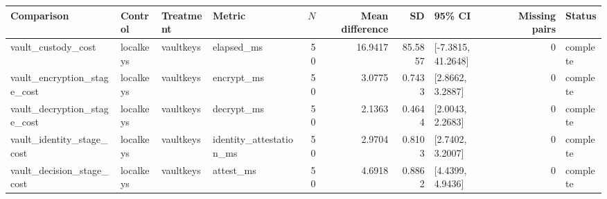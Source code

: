 \begin{tabular}{llllrrrlrl}
Comparison & Control & Treatment & Metric & $N$ & Mean difference & SD & 95\% CI & Missing pairs & Status \\
\hline
vault\_custody\_cost & localkeys & vaultkeys & elapsed\_ms & 50 & 16.9417 & 85.5857 & [-7.3815, 41.2648] & 0 & complete \\
vault\_encryption\_stage\_cost & localkeys & vaultkeys & encrypt\_ms & 50 & 3.0775 & 0.7433 & [2.8662, 3.2887] & 0 & complete \\
vault\_decryption\_stage\_cost & localkeys & vaultkeys & decrypt\_ms & 50 & 2.1363 & 0.4644 & [2.0043, 2.2683] & 0 & complete \\
vault\_identity\_stage\_cost & localkeys & vaultkeys & identity\_attestation\_ms & 50 & 2.9704 & 0.8103 & [2.7402, 3.2007] & 0 & complete \\
vault\_decision\_stage\_cost & localkeys & vaultkeys & attest\_ms & 50 & 4.6918 & 0.8862 & [4.4399, 4.9436] & 0 & complete \\
\end{tabular}
